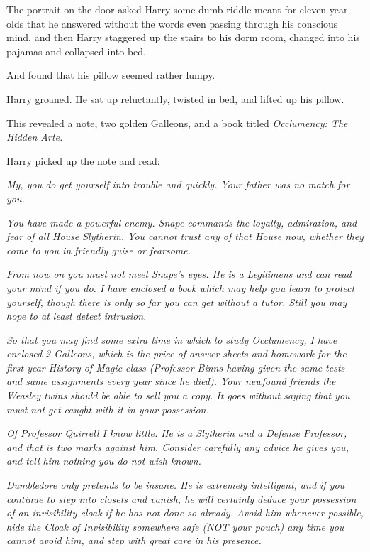 The portrait on the door asked Harry some dumb riddle meant for 
eleven-year-olds that he answered without the words even passing through his 
conscious mind, and then Harry staggered up the stairs to his dorm room, 
changed into his pajamas and collapsed into bed.

And found that his pillow seemed rather lumpy.

Harry groaned. He sat up reluctantly, twisted in bed, and lifted up his pillow.

This revealed a note, two golden Galleons, and a book titled \emph{Occlumency: 
The Hidden Arte.}

Harry picked up the note and read:

\emph{My, you do get yourself into trouble and quickly. Your father was no 
match for you.}

\emph{You have made a powerful enemy. Snape commands the loyalty, admiration, 
and fear of all House Slytherin. You cannot trust any of that House now, 
whether they come to you in friendly guise or fearsome.}

\emph{From now on you must not meet Snape's eyes. He is a Legilimens and can 
read your mind if you do. I have enclosed a book which may help you learn to 
protect yourself, though there is only so far you can get without a tutor. 
Still you may hope to at least detect intrusion.}

\emph{So that you may find some extra time in which to study Occlumency, I have 
enclosed 2 Galleons, which is the price of answer sheets and homework for the 
first-year History of Magic class (Professor Binns having given the same tests 
and same assignments every year since he died). Your newfound friends the 
Weasley twins should be able to sell you a copy. It goes without saying that 
you must not get caught with it in your possession.}

\emph{Of Professor Quirrell I know little. He is a Slytherin and a Defense 
Professor, and that is two marks against him. Consider carefully any advice he 
gives you, and tell him nothing you do not wish known.}

\emph{Dumbledore only pretends to be insane. He is extremely intelligent, and 
if you continue to step into closets and vanish, he will certainly deduce your 
possession of an invisibility cloak if he has not done so already. Avoid him 
whenever possible, hide the Cloak of Invisibility somewhere safe (NOT your 
pouch) any time you cannot avoid him, and step with great care in his presence.}

